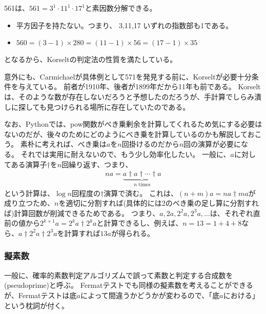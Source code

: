 \begin{Exam}{}{}
561は、$561=3^1\cdot 11^1 \cdot17^1$と素因数分解できる。
\begin{itemize}
 \item 平方因子を持たない。つまり、 3,11,17 いずれの指数部も1である。
 \item $560 = (3−1) \times 280 = (11−1) \times 56 = (17−1) \times 35$
\end{itemize}
となるから、Korseltの判定法の性質を満たしている。
\end{Exam}


意外にも、Carmichaelが具体例として571を発見する前に、Korseltが必要十分条件を与えている。
前者が1910年、後者が1899年だから11年も前である。
Korseltは、そのような数が存在しないだろうと予想したのだろうが、手計算でしらみ潰しに探しても見つけられる場所に存在していたのである。

なお、Pythonでは、pow関数がべき乗剰余を計算してくれるため気にする必要はないのだが、後々のためにどのようにべき乗を計算しているのかも解説しておこう。
素朴に考えれば、べき乗は$a$を$n$回掛けるのだから$n$回の演算が必要になる。
それでは実用に耐えないので、もう少し効率化したい。
一般に、$a$に対してある演算子$\dagger$を$n$回繰り返す、つまり、
\begin{align*}
na = \underbrace{a \dagger a \dagger \cdots \dagger a }_{n\text{ times}}
\end{align*}
という計算は、$\log{n}$回程度の$\dagger$演算で済む。
これは、$(n+m)a = na \dagger ma$が成り立つため、$n$を適切に分割すれば(具体的には2のべき乗の足し算に分割すれば)計算回数が削減できるためである。
つまり、$a, 2a, 2^2a, 2^3a, \ldots$は、それぞれ直前の値から$2^{k+1}a = 2^ka \dagger 2^ka$と計算できるし、例えば、$n=13=1+4+8$なら、$a \dagger 2^2a \dagger 2^3a$を計算すれば$13a$が得られる。


\subsubsection{擬素数}
一般に、確率的素数判定アルゴリズムで誤って素数と判定する合成数を(pseudoprime)と呼ぶ。
Fermatテストでも同様の擬素数を考えることができるが、Fermatテストは底$a$によって間違うかどうかが変わるので、「底$a$における」という枕詞が付く。

